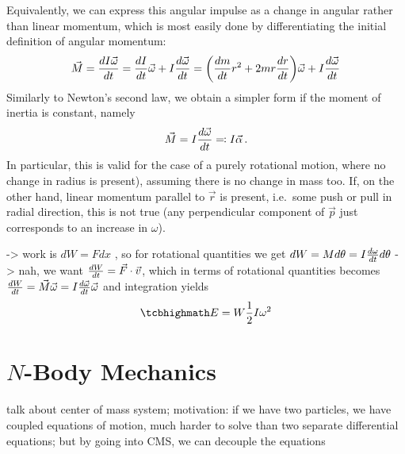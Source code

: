 \documentclass[../class_mech_main.tex]{subfiles}
\begin{document}

Equivalently, we can express this angular impulse as a change in angular rather than linear momentum, which is most easily done by differentiating the initial definition of angular momentum:
\begin{align}
	\vec{M} = \dv{I \vec{\omega}}{t} = \dv{I}{t} \vec{\omega} + I \dv{\vec{\omega}}{t}
	= \qty(\dv{m}{t} r^2 + 2 m r \dv{r}{t}) \vec{\omega} + I \dv{\vec{\omega}}{t}
\end{align}
Similarly to Newton's second law, we obtain a simpler form if the moment of inertia is constant, namely
\begin{equation}
	\vec{M} = I \dv{\vec{\omega}}{t} \eqqcolon I \vec{\alpha} \, .
\end{equation}
In particular, this is valid for the case of a purely rotational motion, where no change in radius is present), assuming there is no change in mass too. If, on the other hand, linear momentum parallel to $\vec{r}$ is present, i.e.~some push or pull in radial direction, this is not true (any perpendicular component of $\vec{p}$ just corresponds to an increase in $\omega$).



-> work is $dW = F dx$ , so for rotational quantities we get $dW = M d\theta = I \dv{\omega}{t} d\theta$  -> nah, we want $\dv{W}{t} = \vec{F} \cdot \vec{v}$, which in terms of rotational quantities becomes $\dv{W}{t} = \vec{M} \vec{\omega} = I \dv{\vec{\omega}}{t} \vec{\omega}$ and integration yields
\begin{equation}
	\eqbox{
		E = W \frac{1}{2} I \omega^2
	}
\end{equation}



	\section{$N$-Body Mechanics}
talk about center of mass system; motivation: if we have two particles, we have coupled equations of motion, much harder to solve than two separate differential equations; but by going into CMS, we can decouple the equations
\end{document}
